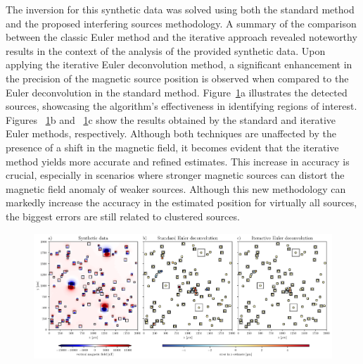 The inversion for this synthetic data was solved using both the standard method \citep{Souza-Junior2023b} and the proposed interfering sources methodology. A summary of the comparison between the classic Euler method and the iterative approach revealed noteworthy results in the context of the analysis of the provided synthetic data. Upon applying the iterative Euler deconvolution method, a significant enhancement in the precision of the magnetic source position is observed when compared to the Euler deconvolution in the standard method. Figure~\ref{euler2}a illustrates the detected sources, showcasing the algorithm's effectiveness in identifying regions of interest. Figures ~\ref{euler2}b and ~\ref{euler2}c show the results obtained by the standard and iterative Euler methods, respectively. Although both techniques are unaffected by the presence of a shift in the magnetic field, it becomes evident that the iterative method yields more accurate and refined estimates. This increase in accuracy is crucial, especially in scenarios where stronger magnetic sources can distort the magnetic field anomaly of weaker sources. Although this new methodology can markedly increase the accuracy in the estimated position for virtually all sources, the biggest errors are still related to clustered sources.

\begin{figure}[tb!]
  \centering
  \includegraphics[width=1\linewidth]{paper/figures/euler-comparion-2.png}
  \caption{
      }
  \label{euler2}
\end{figure}

